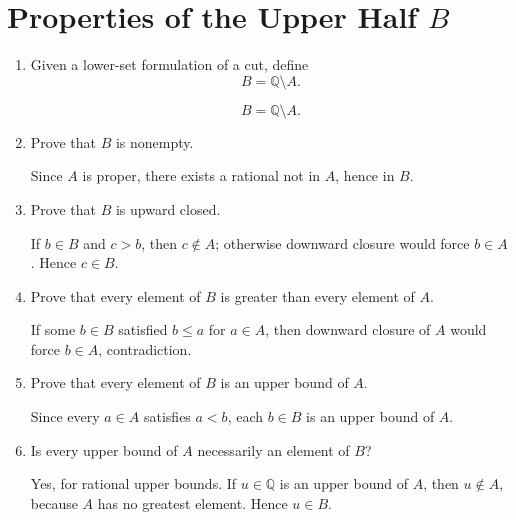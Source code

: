 \documentclass{essay}
\begin{document}
\section{Properties of the Upper Half \texorpdfstring{$B$}{B}}

\begin{enumerate}[label=\arabic*., itemsep=10pt]

\item Given a lower-set formulation of a cut, define
\[
B=\mathbb{Q}\setminus A.
\]

\begin{answer}
\[
B=\mathbb{Q}\setminus A.
\]
\end{answer}

\item Prove that $B$ is nonempty.

\begin{answer}
Since $A$ is proper, there exists a rational not in $A$, hence in $B$.
\end{answer}

\item Prove that $B$ is upward closed.

\begin{answer}
If $b\in B$ and $c>b$, then $c\notin A$; otherwise downward closure would force $b\in A$. Hence $c\in B$.
\end{answer}

\item Prove that every element of $B$ is greater than every element of $A$.

\begin{answer}
If some $b\in B$ satisfied $b\le a$ for $a\in A$, then downward closure of $A$ would force $b\in A$, contradiction.
\end{answer}

\item Prove that every element of $B$ is an upper bound of $A$.

\begin{answer}
Since every $a\in A$ satisfies $a<b$, each $b\in B$ is an upper bound of $A$.
\end{answer}

\item Is every upper bound of $A$ necessarily an element of $B$?

\begin{answer}
Yes, for rational upper bounds. If $u\in\mathbb{Q}$ is an upper bound of $A$, then $u\notin A$, because $A$ has no greatest element. Hence $u\in B$.
\end{answer}


\end{enumerate}
\end{document}
